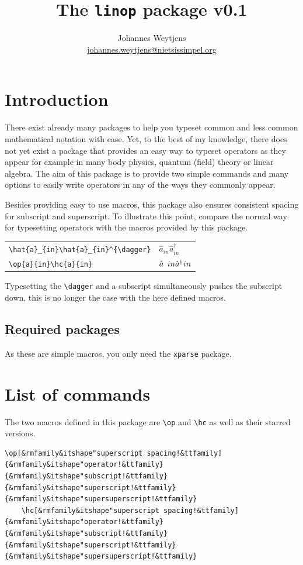 \documentclass[10pt]{article}
\title{The \texttt{linop} package v0.1}
\author{Johannes Weytjens \\ \href{johannes.weytjens@nietsissimpel.org}{johannes.weytjens@nietsissimpel.org}}
\begin{document}
\maketitle

\tableofcontents

\section{Introduction}
There exist already many packages to help you typeset common and less common mathematical notation with ease. Yet, to the best of my knowledge, there does not yet exist a package that provides an easy way to typeset operators as they appear for example in many body physics, quantum (field) theory or linear algebra. The aim of this package is to provide two simple commands and many options to easily write operators in any of the ways they commonly appear.

Besides providing easy to use macros, this package also ensures consistent spacing for subscript and superscript. To illustrate this point, compare the normal way for typesetting operators with the macros provided by this package.

\begin{table}[ht]
	\centering
	\begin{tabular}{ll}
		\verb|\hat{a}_{in}\hat{a}_{in}^{\dagger}| & $\hat{a}_{in}\hat{a}_{in}^{\dagger}$ \\
		\verb|\op{a}{in}\hc{a}{in}| & $\op{a}{in}\hc{a}{in}$
	\end{tabular}
\end{table}

Typesetting the \verb|\dagger| and a subscript simultaneously pushes the subscript down, this is no longer the case with the here defined macros.

\subsection{Required packages}
As these are simple macros, you only need the \texttt{xparse} package.

\newpage
\section{List of commands}
The two macros defined in this package are \verb|\op| and \verb|\hc| as well as their starred versions.

\begin{Verbatim}[commandchars=\&\"\!]
	\op[&rmfamily&itshape"superscript spacing!&ttfamily]{&rmfamily&itshape"operator!&ttfamily}{&rmfamily&itshape"subscript!&ttfamily}{&rmfamily&itshape"superscript!&ttfamily}{&rmfamily&itshape"supersuperscript!&ttfamily}
	\hc[&rmfamily&itshape"superscript spacing!&ttfamily]{&rmfamily&itshape"operator!&ttfamily}{&rmfamily&itshape"subscript!&ttfamily}{&rmfamily&itshape"superscript!&ttfamily}{&rmfamily&itshape"supersuperscript!&ttfamily}
\end{Verbatim}
\end{document}

